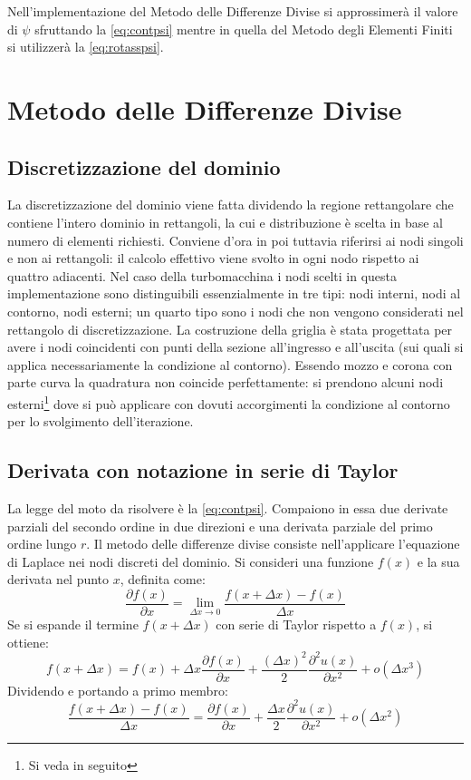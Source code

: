 \documentclass{tufte-handout}
\newcommand{\de}[2]{\dfrac{\partial #1}{\partial #2}}
\newcommand{\dede}[2]{\dfrac{\partial^2 #1}{\partial #2^2}}
\begin{document}
Nell'implementazione del Metodo delle Differenze Divise si approssimerà il valore di $\psi$ sfruttando la \ref{eq:contpsi} mentre in quella del Metodo degli Elementi Finiti si utilizzerà la \ref{eq:rotasspsi}.

\section{Metodo delle Differenze Divise}
\subsection{Discretizzazione del dominio}
La discretizzazione del dominio viene fatta dividendo la regione rettangolare che contiene l'intero dominio in rettangoli, la cui e distribuzione è scelta in base al numero di elementi richiesti. Conviene d'ora in poi tuttavia riferirsi ai nodi singoli e non ai rettangoli: il calcolo effettivo viene svolto in ogni nodo rispetto ai quattro adiacenti.
Nel caso della turbomacchina i nodi scelti in questa implementazione sono distinguibili essenzialmente in tre tipi: nodi interni, nodi al contorno, nodi esterni; un quarto tipo sono i nodi che non vengono considerati nel rettangolo di discretizzazione. La costruzione della griglia è stata progettata per avere i nodi coincidenti con punti della sezione all'ingresso e all'uscita (sui quali si applica necessariamente la condizione al contorno). Essendo mozzo e corona con parte curva la quadratura non coincide perfettamente: si prendono alcuni nodi esterni\footnote{Si veda in seguito} dove si può applicare con dovuti accorgimenti la condizione al contorno per lo svolgimento dell'iterazione.

\subsection{Derivata con notazione in serie di Taylor}
La legge del moto da risolvere è la \ref{eq:contpsi}. Compaiono in essa due derivate parziali del secondo ordine in due direzioni e una derivata parziale del primo ordine lungo $r$. Il metodo delle differenze divise consiste nell'applicare l'equazione di Laplace nei nodi discreti del dominio.
Si consideri una funzione $f(x)$ e la sua derivata nel punto $x$, definita come:
\begin{equation*}
    \de{f(x)}{x} =
    \lim_{\Delta x \to 0}
    \frac{f(x+\Delta x)-f(x)}{\Delta x}
\end{equation*}
Se si espande il termine $f(x+\Delta x)$ con serie di Taylor rispetto a $f(x)$, si ottiene:
\begin{equation*}
    f(x+\Delta x) = f(x) +
    \Delta x \de{f(x)}{x} +
    \frac{(\Delta x)^2}{2} \dede{u(x)}{x} + 
    o(\Delta x^3)
\end{equation*}
Dividendo e portando a primo membro:
\begin{equation*}
    \frac{f(x+\Delta x) - f(x)}{\Delta x} =
     \de{f(x)}{x} +
    \frac{\Delta x}{2} \dede{u(x)}{x} + 
    o(\Delta x^2)
\end{equation*}
\end{document}
